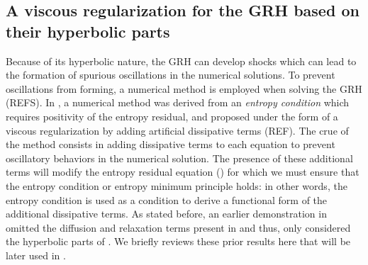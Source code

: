 \documentclass[review]{elsarticle}
\begin{document}
\subsection{A viscous regularization for the GRH based on their hyperbolic parts \cite{our_jcp_radhy_paper}}\label{sec:VR_old}
%
Because of its hyperbolic nature, the GRH can develop shocks which can lead to the formation of spurious oscillations in the numerical solutions. To prevent oscillations from forming, a numerical method is employed when solving the GRH (REFS). In \cite{our_jcp_radhy_paper}, a numerical method was derived from an \emph{entropy condition} which requires positivity of the entropy residual, and proposed under the form of a viscous regularization by adding artificial dissipative terms (REF). 
The crue of the method consists in adding dissipative terms to each equation to prevent oscillatory behaviors in the numerical solution. The presence of these additional terms will modify the entropy residual equation () for which we must ensure that the entropy condition or entropy minimum principle holds: in other words, the entropy condition is used as a condition to derive a functional form of the additional dissipative terms. As stated before, an earlier demonstration in \cite{our_jcp_radhy_paper} omitted the diffusion and relaxation terms present in  and thus, only considered the hyperbolic parts of . We briefly reviews these prior results here that will be later used in . 
\end{document}
